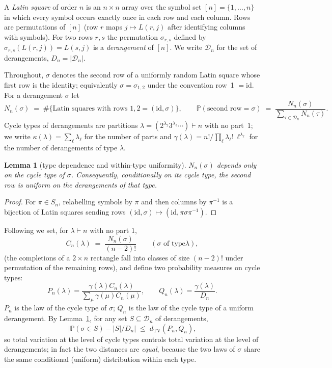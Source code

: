 \documentclass[11pt]{article}
\newtheorem{lemma}[theorem]{Lemma}
\theoremstyle{definition}
\newcommand{\dtv}{d_{\mathrm{TV}}}
\renewcommand{\Pr}{\mathbb{P}}
\newcommand{\DD}{\mathcal{D}}
\newcommand{\PP}{P}
\newcommand{\QQ}{Q}
\newcommand{\CC}{C}
\begin{document}
A \emph{Latin square} of order $n$ is an $n\times n$ array over the symbol set
$[n]=\{1,\dots,n\}$ in which every symbol occurs exactly once in each row and
each column.  Rows are permutations of $[n]$ (row $r$ maps $j\mapsto L(r,j)$
after identifying columns with symbols).  For two rows $r,s$ the permutation
$\sigma_{r,s}$ defined by $\sigma_{r,s}(L(r,j))=L(s,j)$ is a
\emph{derangement} of $[n]$.  We write $\DD_n$ for the set of derangements,
$D_n=|\DD_n|$.

Throughout, $\sigma$ denotes the second row of a uniformly random Latin
square whose first row is the identity; equivalently
$\sigma=\sigma_{1,2}$ under the convention row~1 $=\mathrm{id}$.  For a
derangement $\sigma$ let
\[
N_n(\sigma)\;=\;\#\bigl\{\text{Latin squares with rows } 1,2
 = (\mathrm{id},\sigma)\bigr\},
\qquad
\Pr(\text{second row}=\sigma)\;=\;\frac{N_n(\sigma)}{\sum_{\tau\in\DD_n}N_n(\tau)}.
\]
Cycle types of derangements are partitions
$\lambda=(2^{\lambda_2}3^{\lambda_3}\cdots)\vdash n$ with no part~$1$; we
write $\kappa(\lambda)=\sum_\ell \lambda_\ell$ for the number of parts and
$\gamma(\lambda)=n!/\prod_\ell \lambda_\ell!\,\ell^{\lambda_\ell}$ for the
number of derangements of type $\lambda$.

\begin{lemma}[type dependence and within-type uniformity]\label{lem:type}
$N_n(\sigma)$ depends only on the cycle type of $\sigma$.  Consequently,
conditionally on its cycle type, the second row is uniform on the
derangements of that type.
\end{lemma}

\begin{proof}
For $\pi\in S_n$, relabelling symbols by $\pi$ and then columns by $\pi^{-1}$
is a bijection of Latin squares sending rows
$(\mathrm{id},\sigma)\mapsto(\mathrm{id},\pi\sigma\pi^{-1})$.
\end{proof}

Following \cite{CGW08} we set, for $\lambda\vdash n$ with no part $1$,
\[
\CC_n(\lambda)\;=\;\frac{N_n(\sigma)}{(n-2)!}\qquad(\sigma\text{ of type
}\lambda),
\]
(the completions of a $2\times n$ rectangle fall into classes of size
$(n-2)!$ under permutation of the remaining rows), and define two probability
measures on cycle types:
\[
\PP_n(\lambda)=\frac{\gamma(\lambda)\CC_n(\lambda)}
     {\sum_{\mu}\gamma(\mu)\CC_n(\mu)},
\qquad
\QQ_n(\lambda)=\frac{\gamma(\lambda)}{D_n}.
\]
$\PP_n$ is the law of the cycle type of $\sigma$; $\QQ_n$ is the law of the
cycle type of a uniform derangement.  By Lemma~\ref{lem:type}, for any set
$S\subseteq \DD_n$ of derangements,
\begin{equation}\label{eq:setTV}
\bigl|\Pr(\sigma\in S)-|S|/D_n\bigr|\;\le\;\dtv(\PP_n,\QQ_n),
\end{equation}
so total variation at the level of cycle types controls total variation at
the level of derangements; in fact the two distances are \emph{equal},
because the two laws of $\sigma$ share the same conditional (uniform)
distribution within each type.
\end{document}

